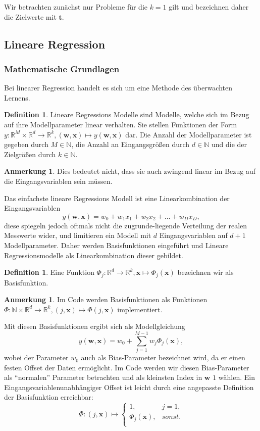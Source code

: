 \documentclass{article}
\theoremstyle{plain} %
\theoremstyle{definition} %
\newtheorem{definition}[theorem]{Definition}
\newtheorem{anno}[theorem]{Anmerkung}
\begin{document}
Wir betrachten zunächst nur Probleme für die $k=1$ gilt und bezeichnen daher die Zielwerte mit $\mathbf{t}$.

\subsection{Lineare Regression}
\subsubsection{Mathematische Grundlagen}
Bei linearer Regression handelt es sich um eine Methode des überwachten Lernens.
\begin{definition}
  Lineare Regressions Modelle sind Modelle, welche sich im Bezug auf ihre Modellparameter linear verhalten\cite[S. 137f]{Bishop}. Sie stellen Funktionen der Form $y: \mathbb{R}^M \times \mathbb{R}^d \rightarrow \mathbb{R}^k, (\mathbf{w}, \mathbf{x}) \mapsto y(\mathbf{w}, \mathbf{x})$ dar. Die Anzahl der Modellparameter ist gegeben durch $M \in \mathbb{N}$, die Anzahl an Eingangsgrößen durch $d \in \mathbb{N}$ und die der Zielgrößen durch $k \in \mathbb{N}$.
\end{definition}
\begin{anno}
  Dies bedeutet nicht, dass sie auch zwingend linear im Bezug auf die Eingangsvariablen sein müssen.
\end{anno}

Das einfachste lineare Regressions Modell ist eine Linearkombination der Eingangsvariablen 
$$
  y(\mathbf{w}, \mathbf{x}) = w_0 + w_1x_1 + w_2x_2 + \hdots + w_Dx_D,
$$
diese spiegeln jedoch oftmals nicht die zugrunde-liegende Verteilung der realen Messwerte wider, und limitieren ein Modell mit $d$ Eingangsvariablen auf $d+1$ Modellparameter. Daher werden Basisfunktionen eingeführt und Lineare Regressionsmodelle als Linearkombination dieser gebildet.
\begin{definition}
  Eine Funktion $\Phi_j: \mathbb{R}^d \rightarrow \mathbb{R}^k, \mathbf{x} \mapsto \Phi_j(\mathbf{x})$ bezeichnen wir als Basisfunktion.
\end{definition}
\begin{anno}
  Im Code werden Basisfunktionen als Funktionen $\Phi: \mathbb{N} \times \mathbb{R}^d \rightarrow \mathbb{R}^k, (j, \mathbf{x}) \mapsto \Phi(j, \mathbf{x})$ implementiert.
\end{anno}

Mit diesen Basisfunktionen ergibt sich als Modellgleichung
$$
  y(\mathbf{w}, \mathbf{x}) = w_0 + \sum_{j=1}^{M-1}w_j\Phi_j(\mathbf{x}),
$$
wobei der Parameter $w_0$ auch als Bias-Parameter bezeichnet wird, da er einen festen Offset der Daten ermöglicht. Im Code werden wir diesen Bias-Parameter als ``normalen'' Parameter betrachten und als kleinsten Index in $\mathbf{w}$ $1$ wählen. Ein Eingangsvariablenunabhängiger Offset ist leicht durch eine angepasste Definition der Basisfunktion erreichbar:
\[ \Phi: (j, \mathbf{x}) \mapsto
 \left\{
  \begin{array}{ll}
    1,& j=1, \\
    \Phi_j(\mathbf{x}), & sonst. \\  
  \end{array}
\right. \]
\end{document}
